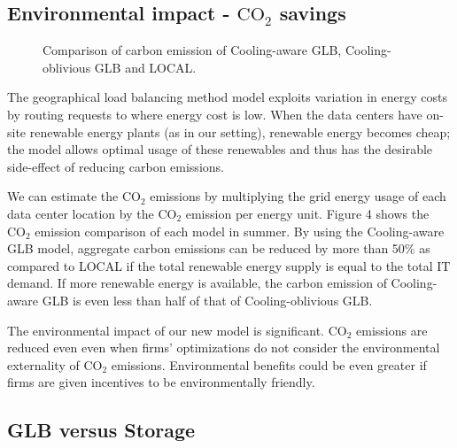 \documentclass{acm_proc_article-sp}
\newcommand{\carbondioxide}{\ensuremath{\mathrm{CO}_2}}
\begin{document}
\subsection{Environmental impact - \carbondioxide{} savings}


\begin{figure}
\centering
{}
\caption{Comparison of carbon emission of Cooling-aware GLB, Cooling-oblivious GLB and LOCAL.}
\end{figure}


The geographical load balancing method model exploits variation in energy costs by routing requests to where energy cost is low. When the data centers have on-site renewable energy plants (as in our setting), renewable energy becomes cheap; the model allows optimal usage of these renewables and thus has the desirable side-effect of reducing carbon emissions.

We can estimate the \carbondioxide{} emissions by multiplying the grid energy usage of each data center location by the \carbondioxide{} emission per energy unit. Figure 4 shows the \carbondioxide{} emission comparison of each model in summer. By using the Cooling-aware GLB model, aggregate carbon emissions can be reduced by more than 50\% as compared to LOCAL if the total renewable energy supply is equal to the total IT demand. If more renewable energy is available, the carbon emission of Cooling-aware GLB is even less than half of that of Cooling-oblivious GLB.

The environmental impact of our new model is significant. \carbondioxide{} emissions are reduced even even when firms' optimizations do not consider the environmental externality of \carbondioxide{} emissions. Environmental benefits could be even greater if firms are given incentives to be environmentally friendly.


\subsection{GLB versus Storage}
\end{document}
